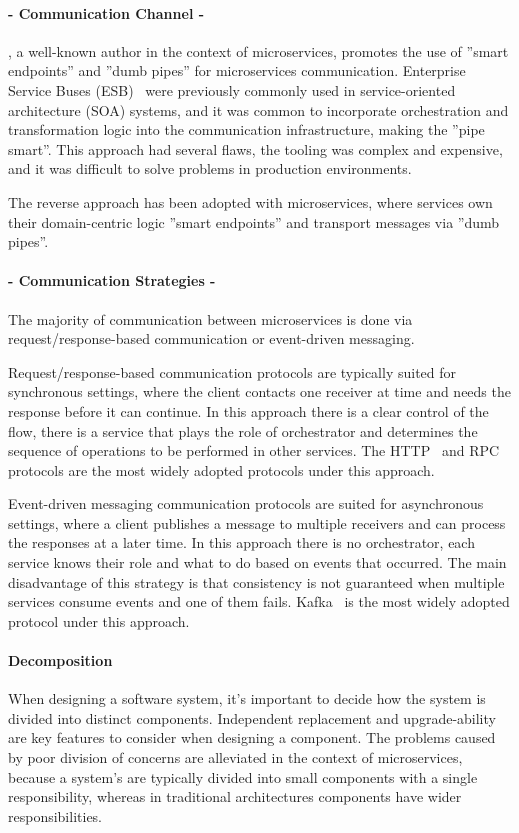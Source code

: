 \paragraph{- Communication Channel -}

\citeauthor{microservices}, a well-known author in the context of microservices, promotes the use of ''smart endpoints'' and ''dumb pipes'' for microservices communication.
Enterprise Service Buses (ESB)~\cite{esb} were previously commonly used in service-oriented architecture (SOA) systems,
and it was common to incorporate orchestration and transformation logic into the communication infrastructure,
making the ''pipe smart''.
This approach had several flaws, the tooling was complex and expensive, and it was difficult to solve problems in production environments.

The reverse approach has been adopted with microservices,
where services own their domain-centric logic ''smart endpoints'' and transport messages via ''dumb pipes''.

\paragraph{- Communication Strategies -}
The majority of communication between microservices is done via request/response-based communication or event-driven messaging.

Request/response-based communication protocols are typically suited for synchronous settings,
where the client contacts one receiver at time and needs the response before it can continue.
In this approach there is a clear control of the flow,
there is a service that plays the role of orchestrator and determines the sequence of operations to be performed in other services.
The HTTP~\cite{http} and RPC~\cite{rpc} protocols are the most widely adopted protocols under this approach.

Event-driven messaging communication protocols are suited for asynchronous settings,
where a client publishes a message to multiple receivers and can process the responses at a later time.
In this approach there is no orchestrator, each service knows their role and what to do based on events that occurred.
The main disadvantage of this strategy is that consistency is not guaranteed when multiple services consume events and one of them fails.
Kafka~\cite{kafka} is the most widely adopted protocol under this approach.

\paragraph{Decomposition}
When designing a software system, it's important to decide how the system is divided into distinct components.
Independent replacement and upgrade-ability are key features to consider when designing a component.
The problems caused by poor division of concerns are alleviated in the context of microservices, because a system's are typically divided into small components with a single responsibility,
whereas in traditional architectures components have wider responsibilities.

